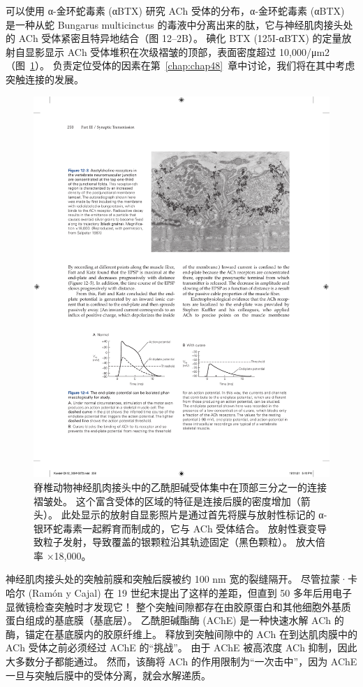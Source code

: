 可以使用 α-金环蛇毒素 (αBTX) 研究 ACh 受体的分布，α-金环蛇毒素 (αBTX) 是一种从蛇 Bungarus multicinctus 的毒液中分离出来的肽，它与神经肌肉接头处的 ACh 受体紧密且特异地结合（图 12–2B）。 
碘化 BTX (125I-αBTX) 的定量放射自显影显示 ACh 受体堆积在次级褶皱的顶部，表面密度超过 10,000/μm2（图~\ref{fig:12_3}）。
负责定位受体的因素在第~\ref{chap:chap48}~章中讨论，我们将在其中考虑突触连接的发展。


\begin{figure}[htbp]
	\centering
	\includegraphics[width=0.6\linewidth]{chap12/fig_12_3}
	\caption{脊椎动物神经肌肉接头中的乙酰胆碱受体集中在顶部三分之一的连接褶皱处。
		这个富含受体的区域的特征是连接后膜的密度增加（箭头）。
		此处显示的放射自显影照片是通过首先将膜与放射性标记的 α-银环蛇毒素一起孵育而制成的，它与 ACh 受体结合。
		放射性衰变导致粒子发射，导致覆盖的银颗粒沿其轨迹固定（黑色颗粒）。
		放大倍率 ×18,000。}
	\label{fig:12_3}
\end{figure}



神经肌肉接头处的突触前膜和突触后膜被约 100 nm 宽的裂缝隔开。
尽管拉蒙·卡哈尔 (Ramón y Cajal) 在 19 世纪末提出了这样的差距，但直到 50 多年后用电子显微镜检查突触时才发现它！
整个突触间隙都存在由胶原蛋白和其他细胞外基质蛋白组成的基底膜（基底层）。
乙酰胆碱酯酶 (AChE) 是一种快速水解 ACh 的酶，锚定在基底膜内的胶原纤维上。
释放到突触间隙中的 ACh 在到达肌肉膜中的 ACh 受体之前必须经过 AChE 的“挑战”。
由于 AChE 被高浓度 ACh 抑制，因此大多数分子都能通过。
然而，该酶将 ACh 的作用限制为“一次击中”，因为 AChE 一旦与突触后膜中的受体分离，就会水解递质。



